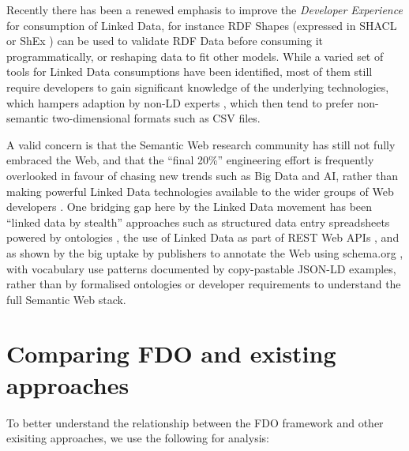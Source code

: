 \documentclass[fleqn,10pt,lineno]{wlpeerjlua}
\begin{document}
Recently there has been a renewed emphasis to improve the \emph{Developer Experience} \cite{BFMoe8FC} for consumption of Linked Data, for instance RDF Shapes (expressed in SHACL \cite{GDrm9dgX} or ShEx \cite{YUzogaV}) can be used to validate RDF Data \cite{ZeOAPNHa,S5BI6Mwx} before consuming it programmatically, or reshaping data to fit other models. While a varied set of tools for Linked Data consumptions have been identified, most of them still require developers to gain significant knowledge of the underlying technologies, which hampers adaption by non-LD experts \cite{o596f2JM}, which then tend to prefer non-semantic two-dimensional formats such as CSV files.

A valid concern is that the Semantic Web research community has still not fully embraced the Web, and that the ``final 20\%'' engineering effort is frequently overlooked in favour of chasing new trends such as Big Data and AI, rather than making powerful Linked Data technologies available to the wider groups of Web developers \cite{jHwttlTs}. One bridging gap here by the Linked Data movement has been ``linked data by stealth'' approaches such as structured data entry spreadsheets powered by ontologies \cite{MhsCt4P3}, the use of Linked Data as part of REST Web APIs \cite{eS6a6tlz}, and as shown by the big uptake by publishers to annotate the Web using schema.org \cite{117tX9MEG}, with vocabulary use patterns documented by copy-pastable JSON-LD examples, rather than by formalised ontologies or developer requirements to understand the full Semantic Web stack.

\hypertarget{sec:comparing}{%
\section*{Comparing FDO and existing approaches}\label{sec:comparing}}

To better understand the relationship between the FDO framework and other exisiting approaches, we use the following for analysis:
\end{document}
